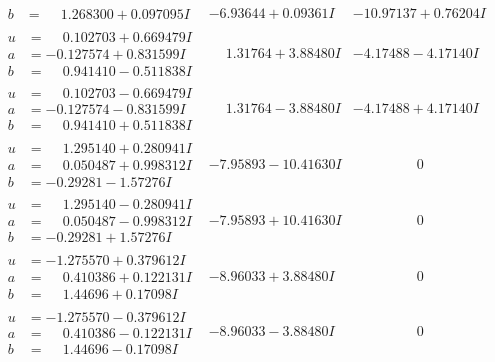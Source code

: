 \documentclass[1p]{elsarticle_modified}
\theoremstyle{definition}
\begin{document}
$$\begin{array}{c|c|c}
\begin{aligned}
b &= \phantom{-}1.268300 + 0.097095 I\end{aligned}
 & -6.93644 + 0.09361 I & -10.97137 + 0.76204 I \\ \hline\begin{aligned}
u &= \phantom{-}0.102703 + 0.669479 I \\
a &= -0.127574 + 0.831599 I \\
b &= \phantom{-}0.941410 - 0.511838 I\end{aligned}
 & \phantom{-}1.31764 + 3.88480 I & -4.17488 - 4.17140 I \\ \hline\begin{aligned}
u &= \phantom{-}0.102703 - 0.669479 I \\
a &= -0.127574 - 0.831599 I \\
b &= \phantom{-}0.941410 + 0.511838 I\end{aligned}
 & \phantom{-}1.31764 - 3.88480 I & -4.17488 + 4.17140 I \\ \hline\begin{aligned}
u &= \phantom{-}1.295140 + 0.280941 I \\
a &= \phantom{-}0.050487 + 0.998312 I \\
b &= -0.29281 - 1.57276 I\end{aligned}
 & -7.95893 - 10.41630 I & \phantom{-0.000000 } 0 \\ \hline\begin{aligned}
u &= \phantom{-}1.295140 - 0.280941 I \\
a &= \phantom{-}0.050487 - 0.998312 I \\
b &= -0.29281 + 1.57276 I\end{aligned}
 & -7.95893 + 10.41630 I & \phantom{-0.000000 } 0 \\ \hline\begin{aligned}
u &= -1.275570 + 0.379612 I \\
a &= \phantom{-}0.410386 + 0.122131 I \\
b &= \phantom{-}1.44696 + 0.17098 I\end{aligned}
 & -8.96033 + 3.88480 I & \phantom{-0.000000 } 0 \\ \hline\begin{aligned}
u &= -1.275570 - 0.379612 I \\
a &= \phantom{-}0.410386 - 0.122131 I \\
b &= \phantom{-}1.44696 - 0.17098 I\end{aligned}
 & -8.96033 - 3.88480 I & \phantom{-0.000000 } 0 \\ \hline\begin{aligned}

\end{aligned}
\end{array}$$
\end{document}
